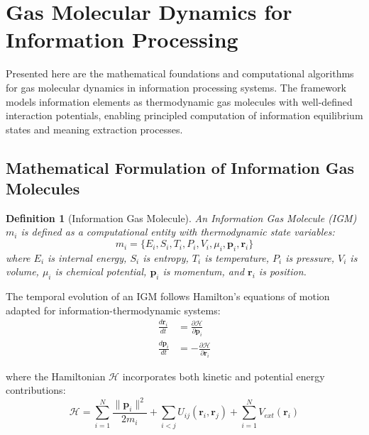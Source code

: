 \documentclass[11pt,a4paper]{article}
\newtheorem{definition}[theorem]{Definition}
\begin{document}
\section{Gas Molecular Dynamics for Information Processing}
\label{sec:gas-molecular-dynamics}

Presented here are the mathematical foundations and computational algorithms for gas molecular dynamics in information processing systems. The framework models information elements as thermodynamic gas molecules with well-defined interaction potentials, enabling principled computation of information equilibrium states and meaning extraction processes.

\subsection{Mathematical Formulation of Information Gas Molecules}

\begin{definition}[Information Gas Molecule]
An Information Gas Molecule (IGM) $m_i$ is defined as a computational entity with thermodynamic state variables:
\begin{equation}
m_i = \{E_i, S_i, T_i, P_i, V_i, \mu_i, \mathbf{p}_i, \mathbf{r}_i\}
\label{eq:igm-definition}
\end{equation}
where $E_i$ is internal energy, $S_i$ is entropy, $T_i$ is temperature, $P_i$ is pressure, $V_i$ is volume, $\mu_i$ is chemical potential, $\mathbf{p}_i$ is momentum, and $\mathbf{r}_i$ is position.
\end{definition}

The temporal evolution of an IGM follows Hamilton's equations of motion adapted for information-thermodynamic systems:
\begin{align}
\frac{d\mathbf{r}_i}{dt} &= \frac{\partial \mathcal{H}}{\partial \mathbf{p}_i} \label{eq:position-evolution} \\
\frac{d\mathbf{p}_i}{dt} &= -\frac{\partial \mathcal{H}}{\partial \mathbf{r}_i} \label{eq:momentum-evolution}
\end{align}

where the Hamiltonian $\mathcal{H}$ incorporates both kinetic and potential energy contributions:
\begin{equation}
\mathcal{H} = \sum_{i=1}^{N} \frac{\|\mathbf{p}_i\|^2}{2m_i} + \sum_{i<j} U_{ij}(\mathbf{r}_i, \mathbf{r}_j) + \sum_{i=1}^{N} V_{ext}(\mathbf{r}_i)
\label{eq:hamiltonian}
\end{equation}
\end{document}
